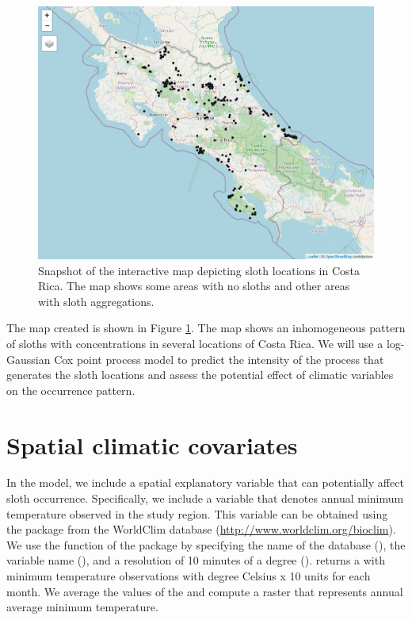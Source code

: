 \begin{figure}[htbp]
  \centering
  \includegraphics[width=.7\textwidth]{tmapview}
  \caption{Snapshot of the interactive map depicting sloth locations in Costa Rica. The map shows some areas with no sloths and other areas with sloth aggregations.
}
  \label{fig:tmapview}
\end{figure}



The map created is shown in Figure \ref{fig:tmapview}. The map shows an inhomogeneous pattern of sloths with concentrations in several locations of Costa Rica.
We will use a log-Gaussian Cox point process model to predict the intensity of the process that generates the sloth locations and assess the potential effect of climatic variables on the occurrence pattern.

\section{Spatial climatic covariates}

In the model, we include a spatial explanatory variable that can potentially affect sloth occurrence.
Specifically, we include a variable that denotes annual minimum temperature observed in the study region.
This variable can be obtained using the  package \citep{Rraster} from the WorldClim database (\url{http://www.worldclim.org/bioclim}).
We use the  function of the  package by specifying the name of the database (),
the variable name (), and a resolution of 10 minutes of a degree ().
 returns a  with minimum temperature observations with degree Celsius x 10 units for each month.
We average the values of the  and compute a raster that represents annual average minimum temperature.


